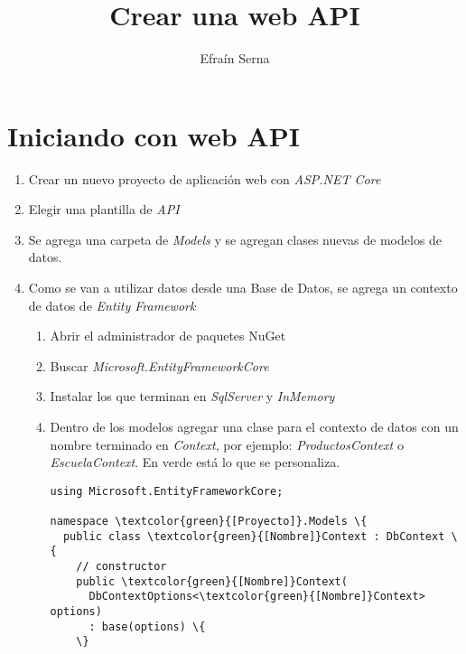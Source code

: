 \documentclass[11pt]{article} %
\title{Crear una web API}
\author{Efraín Serna}
\begin{document}
\maketitle
\tableofcontents

\section{Iniciando con web API}

\begin{enumerate}
\item Crear un  nuevo proyecto de aplicación web con \emph{ASP.NET Core}
\item Elegir una plantilla de \emph{API}
\item Se agrega una carpeta de \emph{Models} y se agregan clases nuevas de modelos de datos.
\item Como se van a utilizar datos desde una Base de Datos, se agrega un contexto de datos de \emph{Entity Framework}
\begin{enumerate}
\item Abrir el administrador de paquetes NuGet
\item Buscar \emph{Microsoft.EntityFrameworkCore}
\item Instalar los que terminan en \emph{SqlServer} y \emph{InMemory}
\item Dentro de los modelos agregar una clase para el contexto de datos con un nombre terminado en \emph{Context}, por ejemplo: \emph{ProductosContext} o \emph{EscuelaContext}. En verde está lo que se personaliza.
\begin{Verbatim}[commandchars=\\\{\}]
using Microsoft.EntityFrameworkCore;

namespace \textcolor{green}{[Proyecto]}.Models \{
  public class \textcolor{green}{[Nombre]}Context : DbContext \{
    // constructor
    public \textcolor{green}{[Nombre]}Context(
      DbContextOptions<\textcolor{green}{[Nombre]}Context> options)
      : base(options) \{
    \}


\end{Verbatim}
\end{enumerate}
\end{enumerate}
\end{document}
